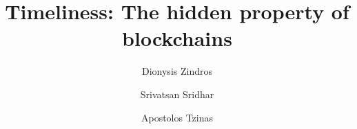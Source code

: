 \title{Timeliness: The hidden property of blockchains}
\ifanonymous{\iflncs
\author{}\institute{}
\fi}
\else
\author{
        Dionysis Zindros \and
        Srivatsan Sridhar  \and
        Apostolos Tzinas
}
